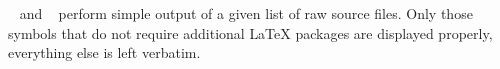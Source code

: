 \begin{isabellebody}
\begin{isamarkuptext}
\begin{descr}
  \item [\hyperlink{command.display-drafts}{\mbox{\isa{\isacommand{display{\isacharunderscore}drafts}}}}~\isa{paths} and \hyperlink{command.print-drafts}{\mbox{\isa{\isacommand{print{\isacharunderscore}drafts}}}}~\isa{paths}] perform simple output of a given list
  of raw source files.  Only those symbols that do not require
  additional {\LaTeX} packages are displayed properly, everything else
  is left verbatim.

  \end{descr}%
\end{isamarkuptext}%
\isamarkuptrue%
%
\isadelimtheory
%
\endisadelimtheory
%
\isatagtheory
{}\isamarkupfalse%
%
\endisatagtheory
{\isafoldtheory}%
%
\isadelimtheory
%
\endisadelimtheory
\isanewline
\end{isabellebody}%
